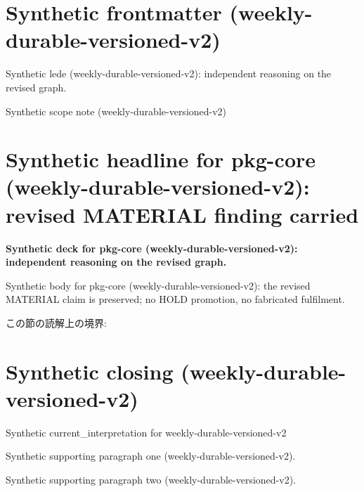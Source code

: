 \documentclass[lualatex,a4paper,10pt]{jlreq}
\begin{document}
\surveycover
\clearpage
\section*{Synthetic frontmatter (weekly-durable-versioned-v2)}
Synthetic lede (weekly-durable-versioned-v2): independent reasoning on the revised graph.

\begin{claimboundary}
\noindent Synthetic scope note (weekly-durable-versioned-v2)\par
\end{claimboundary}
\clearpage
\twocolumn
\section{Synthetic headline for pkg-core (weekly-durable-versioned-v2): revised MATERIAL finding carried}
\label{pkg:pkg-core}
\noindent\textbf{Synthetic deck for pkg-core (weekly-durable-versioned-v2): independent reasoning on the revised graph.} \cite{w2026-W33target-source}\par\medskip
\noindent Synthetic body for pkg-core (weekly-durable-versioned-v2): the revised MATERIAL claim is preserved; no HOLD promotion, no fabricated fulfilment.\par\medskip
\begin{claimboundary}
この節の読解上の境界: 
\end{claimboundary}
\clearpage
\onecolumn
\section{Synthetic closing (weekly-durable-versioned-v2)}
\label{sec:issue-summary}
\noindent Synthetic current\_interpretation for weekly-durable-versioned-v2\par\medskip
\noindent Synthetic supporting paragraph one (weekly-durable-versioned-v2).\par\medskip
\noindent Synthetic supporting paragraph two (weekly-durable-versioned-v2).\par\medskip
\clearpage
\onecolumn
\printbibliography[title={References / Source Notes}]
\end{document}
